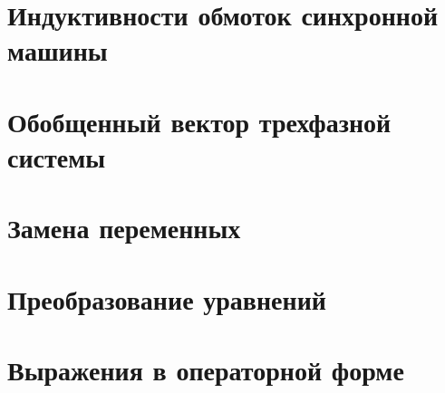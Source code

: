 \section{Индуктивности обмоток синхронной машины}
\label{sec:7-3}


\section{Обобщенный вектор трехфазной системы}
\label{sec:7-4}


\section{Замена переменных}
\label{sec:7-5}


\section{Преобразование уравнений}
\label{sec:7-6}


\section{Выражения в операторной форме}
\label{sec:7-7}